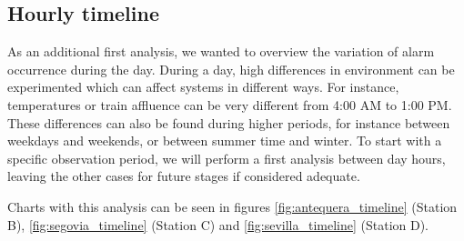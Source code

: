 \subsection{Hourly timeline}
As an additional first analysis, we wanted to overview the variation of alarm occurrence during the day. During a day, high differences in environment can be experimented which can affect systems in different ways. For instance, temperatures or train affluence can be very different from 4:00 AM to 1:00 PM. These differences can also be found during higher periods, for instance between weekdays and weekends, or between summer time and winter. To start with a specific observation period, we will perform a first analysis between day hours, leaving the other cases for future stages if considered adequate.

Charts with this analysis can be seen in figures \ref{fig:antequera_timeline} (Station B), \ref{fig:segovia_timeline} (Station C) and \ref{fig:sevilla_timeline} (Station D).

